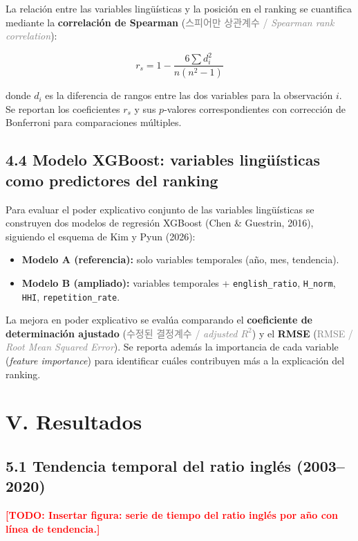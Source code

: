 \documentclass[11pt,a4paper]{article}
\newcommand{\term}[3]{\textbf{#1} (\textcolor{gray}{#2 / \textit{#3}})}
\newcommand{\todo}[1]{\textcolor{red}{\textbf{[TODO: #1]}}}
\begin{document}
La relación entre las variables lingüísticas y la posición en el ranking
se cuantifica mediante la
\term{correlación de Spearman}{스피어만 상관계수}{Spearman rank correlation}:

\[
r_s = 1 - \frac{6\sum d_i^2}{n(n^2-1)}
\]

donde $d_i$ es la diferencia de rangos entre las dos variables para la
observación $i$.
Se reportan los coeficientes $r_s$ y sus $p$-valores correspondientes
con corrección de Bonferroni para comparaciones múltiples.

\subsection*{4.4 Modelo XGBoost: variables lingüísticas como predictores del ranking}

Para evaluar el poder explicativo conjunto de las variables lingüísticas
se construyen dos modelos de regresión XGBoost
(Chen \& Guestrin, 2016), siguiendo el esquema de Kim y Pyun (2026):

\begin{itemize}[leftmargin=1.8em]
    \item \textbf{Modelo A (referencia):} solo variables temporales
    (año, mes, tendencia).
    \item \textbf{Modelo B (ampliado):} variables temporales +
    \texttt{english\_ratio}, \texttt{H\_norm}, \texttt{HHI},
    \texttt{repetition\_rate}.
\end{itemize}

La mejora en poder explicativo se evalúa comparando el
\term{coeficiente de determinación ajustado}{수정된 결정계수}{adjusted $R^2$}
y el \term{RMSE}{RMSE}{Root Mean Squared Error}.
Se reporta además la importancia de cada variable (\textit{feature importance})
para identificar cuáles contribuyen más a la explicación del ranking.

\section*{V. Resultados}

\subsection*{5.1 Tendencia temporal del ratio inglés (2003--2020)}

\todo{Insertar figura: serie de tiempo del ratio inglés por año con línea de tendencia.}
\end{document}
